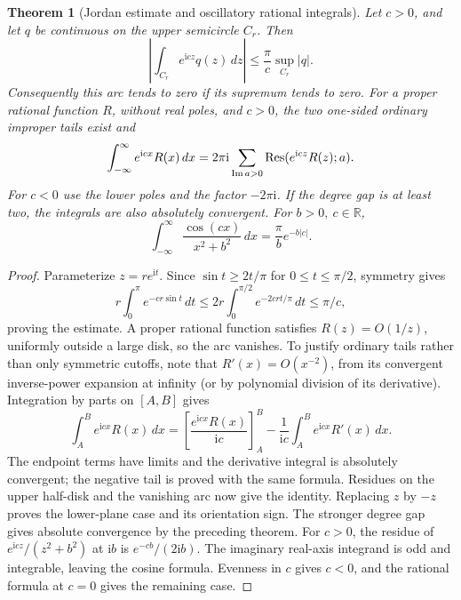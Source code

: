 \documentclass[11pt,a4paper,openany]{book}
\newtheorem{theorem}{Theorem}[chapter]
\theoremstyle{definition}
\theoremstyle{remark}\newtheorem{remark}[theorem]{Remark}
\newcommand{\R}{\mathbb R}\newcommand{\C}{\mathbb C}
\newcommand{\dd}{\,d}\newcommand{\iu}{\mathrm i}
\DeclareMathOperator{\Res}{Res}\DeclareMathOperator{\ind}{ind}
\newcommand{\family}[1]{}
\begin{document}
\begin{theorem}[Jordan estimate and oscillatory rational integrals]\family{D12.08.05}\label{d12:08-05}
Let \(c>0\), and let \(q\) be continuous on the upper semicircle \(C_r\).
Then
\[
 \left|\int_{C_r}e^{\iu cz}q(z)\dd z\right|
 \le\frac{\pi}{c}\sup_{C_r}|q|.
\]
Consequently this arc tends to zero if its supremum tends to zero.
For a proper rational function \(R\), without real poles, and \(c>0\),
the two one-sided ordinary improper tails exist and
\[
 \int_{-\infty}^{\infty}e^{\iu cx}R(x)\dd x
   =2\pi\iu\sum_{\Imm a>0}\Res(e^{\iu cz}R(z);a).
\]
For \(c<0\) use the lower poles and the factor \(-2\pi\iu\).
If the degree gap is at least two, the integrals are also absolutely
convergent. For \(b>0,\ c\in\R\),
\[
 \int_{-\infty}^{\infty}\frac{\cos(cx)}{x^2+b^2}\dd x
       =\frac{\pi}{b}e^{-b|c|}.
\]
\end{theorem}
\begin{proof}
Parameterize \(z=re^{\iu t}\). Since
\(\sin t\ge 2t/\pi\) for \(0\le t\le\pi/2\), symmetry gives
\[
 r\int_0^\pi e^{-cr\sin t}\dd t
 \le2r\int_0^{\pi/2}e^{-2crt/\pi}\dd t
 \le\pi/c,
\]
proving the estimate. A proper rational function satisfies
\(R(z)=O(1/z)\), uniformly outside a large disk, so the arc vanishes.
To justify ordinary tails rather than only symmetric cutoffs, note that
\(R'(x)=O(x^{-2})\), from its convergent inverse-power expansion at
infinity (or by polynomial division of its derivative).
Integration by parts on \([A,B]\) gives
\[
 \int_A^B e^{\iu cx}R(x)\dd x
 =\left[\frac{e^{\iu cx}R(x)}{\iu c}\right]_A^B
   -\frac1{\iu c}\int_A^B e^{\iu cx}R'(x)\dd x.
\]
The endpoint terms have limits and the derivative integral is absolutely
convergent; the negative tail is proved with the same formula.
Residues on the upper half-disk and the vanishing arc now give the
identity. Replacing \(z\) by \(-z\) proves the lower-plane case and its
orientation sign. The stronger degree gap gives absolute convergence
by the preceding theorem.
For \(c>0\), the residue of
\(e^{\iu cz}/(z^2+b^2)\) at \(\iu b\) is
\(e^{-cb}/(2\iu b)\). The imaginary real-axis integrand is odd and
integrable, leaving the cosine formula. Evenness in \(c\) gives
\(c<0\), and the rational formula at \(c=0\) gives the remaining case.
\end{proof}
\end{document}
